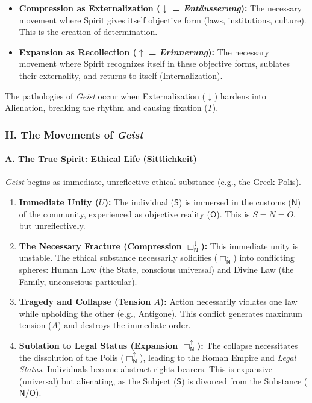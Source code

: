 \begin{itemize}
\tightlist
\item
  \textbf{Compression as Externalization (\(\downarrow\) = \emph{Entäusserung}):} The necessary movement where Spirit gives itself objective form (laws, institutions, culture). This is the creation of determination.
\item
  \textbf{Expansion as Recollection (\(\uparrow\) = \emph{Erinnerung}):} The necessary movement where Spirit recognizes itself in these objective forms, sublates their externality, and returns to itself (Internalization).
\end{itemize}

The pathologies of \emph{Geist} occur when Externalization (\(\downarrow\)) hardens into Alienation, breaking the rhythm and causing fixation (\(T\)).

\subsubsection{\texorpdfstring{II. The Movements of \emph{Geist}}{II. The Movements of Geist}}\label{ii.-the-movements-of-geist}

\paragraph{A. The True Spirit: Ethical Life (Sittlichkeit)}\label{a.-the-true-spirit-ethical-life-sittlichkeit}

\emph{Geist} begins as immediate, unreflective ethical substance (e.g., the Greek Polis).

\begin{enumerate}
\def\labelenumi{\arabic{enumi}.}
\tightlist
\item
  \textbf{Immediate Unity (\(U\)):} The individual (\(\mathsf{S}\)) is immersed in the customs (\(\mathsf{N}\)) of the community, experienced as objective reality (\(\mathsf{O}\)). This is \(S=N=O\), but unreflectively.
\item
  \textbf{The Necessary Fracture (Compression \(\Box_{\mathsf{N}}^{\downarrow}\)):} This immediate unity is unstable. The ethical substance necessarily solidifies (\(\Box_{\mathsf{N}}^{\downarrow}\)) into conflicting spheres: Human Law (the State, conscious universal) and Divine Law (the Family, unconscious particular).
\item
  \textbf{Tragedy and Collapse (Tension \(A\)):} Action necessarily violates one law while upholding the other (e.g., Antigone). This conflict generates maximum tension (\(A\)) and destroys the immediate order.
\item
  \textbf{Sublation to Legal Status (Expansion \(\Box_{\mathsf{N}}^{\uparrow}\)):} The collapse necessitates the dissolution of the Polis (\(\Box_{\mathsf{N}}^{\uparrow}\)), leading to the Roman Empire and \emph{Legal Status}. Individuals become abstract rights-bearers. This is expansive (universal) but alienating, as the Subject (\(\mathsf{S}\)) is divorced from the Substance (\(\mathsf{N/O}\)).
\end{enumerate}

